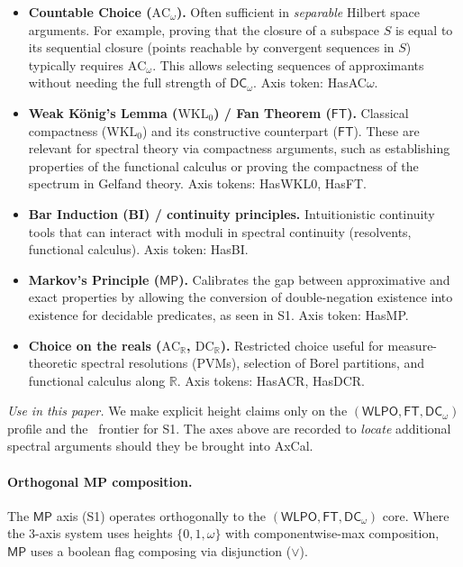 \documentclass[11pt]{article}
\newcommand{\WLPO}{\mathsf{WLPO}}
\newcommand{\FT}{\mathsf{FT}}
\newcommand{\DCw}{\mathsf{DC}_{\omega}}
\newcommand{\MP}{\mathsf{MP}}
\theoremstyle{plain}
\theoremstyle{definition}
\theoremstyle{remark}
\newcommand{\R}{\mathbb{R}}
\newcommand{\ACw}{\mathrm{AC}_\omega}
\newcommand{\ACR}{\mathrm{AC}_{\mathbb{R}}}
\newcommand{\DCR}{\mathrm{DC}_{\mathbb{R}}}
\newcommand{\WKLz}{\mathrm{WKL}_0}
\begin{document}
\begin{itemize}
  \item \textbf{Countable Choice ($\ACw$).} Often sufficient in \emph{separable} Hilbert space arguments. For example, proving that the closure of a subspace $S$ is equal to its sequential closure (points reachable by convergent sequences in $S$) typically requires $\ACw$. This allows selecting sequences of approximants without needing the full strength of $\DCw$. Axis token: \textsf{HasAC$\omega$}.
  
  \item \textbf{Weak K\"onig's Lemma ($\WKLz$) / Fan Theorem ($\FT$).} Classical compactness ($\WKLz$) and its constructive counterpart ($\FT$). These are relevant for spectral theory via compactness arguments, such as establishing properties of the functional calculus or proving the compactness of the spectrum in Gelfand theory. Axis tokens: \textsf{HasWKL0}, \textsf{HasFT}.

  \item \textbf{Bar Induction (BI) / continuity principles.} Intuitionistic continuity tools that can interact with moduli in spectral continuity (resolvents, functional calculus). Axis token: \textsf{HasBI}.

  \item \textbf{Markov's Principle ($\MP$).} Calibrates the gap between approximative and exact properties by allowing the conversion of double-negation existence into existence for decidable predicates, as seen in S1. Axis token: \textsf{HasMP}.

  \item \textbf{Choice on the reals ($\ACR$, $\DCR$).} Restricted choice useful for measure-theoretic spectral resolutions (PVMs), selection of Borel partitions, and functional calculus along $\R$. Axis tokens: \textsf{HasACR}, \textsf{HasDCR}.
\end{itemize}

\noindent
\emph{Use in this paper.} We make explicit height claims only on the $(\WLPO,\FT,\DCw)$ profile and the \MP\ frontier for S1.
The axes above are recorded to \emph{locate} additional spectral arguments should they be brought into AxCal.

\paragraph{Orthogonal MP composition.}
The $\MP$ axis (S1) operates orthogonally to the $(\WLPO, \FT, \DCw)$ core. Where the 3-axis system uses heights $\{0,1,\omega\}$ with componentwise-max composition, $\MP$ uses a boolean flag composing via disjunction ($\lor$). 
\end{document}
